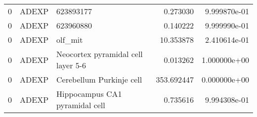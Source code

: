 \begin{tabular}{lllrr}
0 &       ADEXP &                           623893177 &     0.273030 &  9.999870e-01 \\
0 &       ADEXP &                           623960880 &     0.140222 &  9.999990e-01 \\
0 &       ADEXP &                             olf\_mit &    10.353878 &  2.410614e-01 \\
0 &       ADEXP &  Neocortex pyramidal cell layer 5-6 &     0.013262 &  1.000000e+00 \\
0 &       ADEXP &            Cerebellum Purkinje cell &   353.692447 &  0.000000e+00 \\
0 &       ADEXP &      Hippocampus CA1 pyramidal cell &     0.735616 &  9.994308e-01 \\
\bottomrule
\end{tabular}

\begin{table}
\caption[Comparable $\chi^{2}$ for Optimized Results of the Conductance Based Model]{Comparable $\chi^{2}$ for optimized results of the conductance based model. Not all models could be evaluated, as optimization took a long time.}
\end{table}

